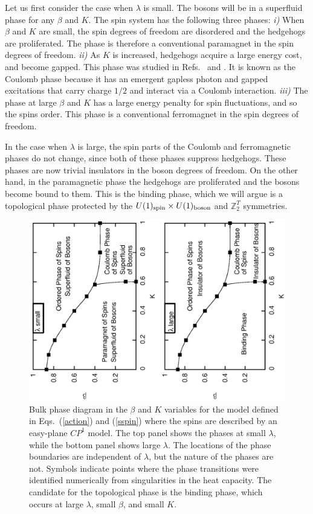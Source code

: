 \documentclass[prb,twocolumn]{revtex4-1}
\def\ztwot{\mathbb{Z}_2^T}
\begin{document}
Let us first consider the case when $\lambda$ is small. The bosons will be in a superfluid phase for any $\beta$ and $K$. The spin system has the following three phases: 
{\it i)} When $\beta$ and $K$ are small, the spin degrees of freedom are disordered and the hedgehogs are proliferated. The phase is therefore a conventional paramagnet in the spin degrees of freedom. 
{\it ii)} As $K$ is increased, hedgehogs acquire a large energy cost, and become gapped. This phase was studied in Refs.~ and . It is known as the Coulomb phase because it has an emergent gapless photon and gapped excitations that carry charge $1/2$ and interact via a Coulomb interaction. 
{\it iii)} The phase at large $\beta$ and $K$ has a large energy penalty for spin fluctuations, and so the spins order. This phase is a conventional ferromagnet in the spin degrees of freedom. 

In the case when $\lambda$ is large, the spin parts of the Coulomb and ferromagnetic phases do not change, since both of these phases suppress hedgehogs. These phases are now trivial insulators in the boson degrees of freedom. On the other hand, in the paramagnetic phase the hedgehogs are proliferated and the bosons become bound to them. This is the binding phase, which we will argue is a topological phase protected by the $U(1)_{\rm spin}\times U(1)_{\rm boson}$ and $\ztwot$ symmetries.



\begin{figure}
\includegraphics[angle=-90,width=\linewidth]{figures/cp1bulkphase.eps}
\caption{Bulk phase diagram in the $\beta$ and $K$ variables for the model defined in Eqs.~(\ref{action}) and (\ref{sspin}) where the spins are described by an easy-plane $CP^1$ model. The top panel shows the phases at small $\lambda$, while the bottom panel shows large $\lambda$. The locations of the phase boundaries are independent of $\lambda$, but the nature of the phases are not. Symbols indicate points where the phase transitions were identified numerically from singularities in the heat capacity. The candidate for the topological phase is the binding phase, which occurs at large $\lambda$, small $\beta$, and small $K$. }
\label{cp1bulkphase}
\end{figure}
 
\end{document}
